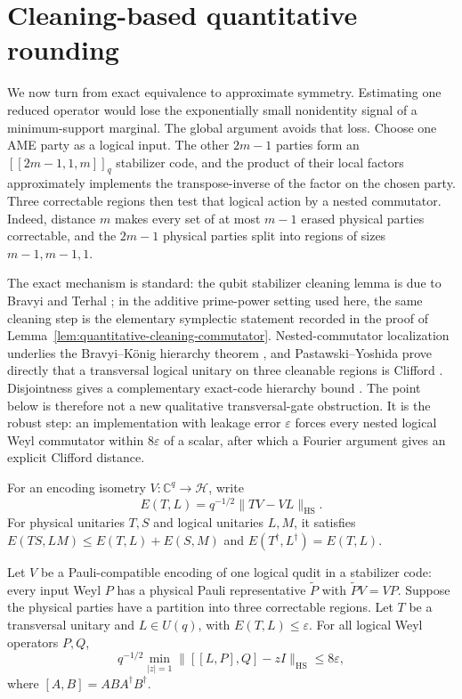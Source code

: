 \section{Cleaning-based quantitative rounding}
\label{sec:quantitative}

We now turn from exact equivalence to approximate symmetry.  Estimating one
reduced operator would lose the exponentially small nonidentity signal of a
minimum-support marginal.  The global argument avoids that loss.  Choose one
AME party as a logical input.  The other \(2m-1\) parties form an
\([[2m-1,1,m]]_q\) stabilizer code, and the product of their local factors
approximately implements the transpose-inverse of the factor on the chosen
party.  Three correctable regions then test that logical action by a nested
commutator.  Indeed, distance \(m\) makes every set of at most \(m-1\)
erased physical parties correctable, and the \(2m-1\) physical parties split
into regions of sizes \(m-1,m-1,1\).

The exact mechanism is standard: the qubit stabilizer
cleaning lemma is due to Bravyi and Terhal
\cite[Lemma~1]{BravyiTerhal2009}; in the additive prime-power setting used
here, the same cleaning step is the elementary symplectic statement recorded
in the proof of Lemma~\ref{lem:quantitative-cleaning-commutator}.
Nested-commutator localization underlies the
Bravyi--K\"onig hierarchy theorem \cite{BravyiKonig2013}, and
Pastawski--Yoshida prove directly that a transversal logical unitary on three
cleanable regions is Clifford \cite[Lemma~5]{PastawskiYoshida2015}.
Disjointness gives a complementary exact-code hierarchy bound
\cite[Theorem~5]{JochymOConnorKubicaYoder2018}.  The point below is therefore
not a new qualitative transversal-gate obstruction.  It is the robust step:
an implementation with leakage error \(\varepsilon\) forces every nested
logical Weyl commutator within \(8\varepsilon\) of a scalar, after which a
Fourier argument gives an explicit Clifford distance.

\AMEFigureFour

For an encoding isometry \(V:\mathbb C^q\to\mathcal H\), write
\[
 E(T,L)=q^{-1/2}\lVert TV-VL\rVert_{\mathrm{HS}}.
\]
For physical unitaries \(T,S\) and logical unitaries \(L,M\), it satisfies
\(E(TS,LM)\leq E(T,L)+E(S,M)\) and
\(E(T^\dagger,L^\dagger)=E(T,L)\).

\begin{lemma}
\label{lem:quantitative-cleaning-commutator}
Let \(V\) be a Pauli-compatible encoding of one logical qudit in a
stabilizer code: every input Weyl \(P\) has a physical Pauli representative
\(\widetilde P\) with \(\widetilde PV=VP\).  Suppose the physical parties
have a partition into three correctable regions.  Let \(T\) be a
transversal unitary and \(L\in U(q)\), with \(E(T,L)\leq\varepsilon\).
For all logical Weyl
operators \(P,Q\),
\[
 q^{-1/2}\min_{|z|=1}
 \lVert [[L,P],Q]-zI\rVert_{\mathrm{HS}}
 \leq8\varepsilon,                                  \tag{6.1}
\]
where \([A,B]=ABA^\dagger B^\dagger\).
\end{lemma}

